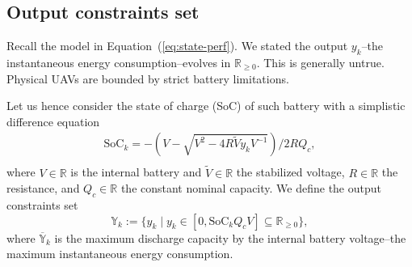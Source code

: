 \documentclass[letterpaper,10pt,conference]{ieeeconf}
\theoremstyle{definition}
\begin{document}



\subsection{Output constraints set}

Recall the model in Equation~(\ref{eq:state-perf}). We stated the output $y_k$--the instantaneous energy consumption--evolves in $\mathbb{R}_{\geq 0}$. This is generally untrue. Physical UAVs are bounded by strict battery limitations.

Let us hence consider the state of charge (SoC) of such battery with a simplistic difference equation~\cite{seewald2020mechanical}
\begin{equation}\begin{split}
  \mathrm{SoC}_k=-\left(V-
  \sqrt{
    V^2-
    4R\tilde{V}y_kV^{-1}}
  \right)/2RQ_c,\\ 
\end{split}\end{equation}
where $V\in\mathbb{R}$ is the internal battery and $\tilde{V}\in\mathbb{R}$ the stabilized voltage, $R\in\mathbb{R}$ the resistance, and $Q_c\in\mathbb{R}$ the constant nominal capacity. We define the output constraints set
\begin{equation}
  \mathbb{Y}_k:=\{y_k\mid y_k\in[0,\mathrm{SoC}_kQ_cV]\subseteq{\mathbb{R}_{\geq 0}}\},
\end{equation}
where $\overline{\mathbb{Y}}_k$ is the maximum discharge capacity by the internal battery voltage--the maximum instantaneous energy consumption.
\end{document}
